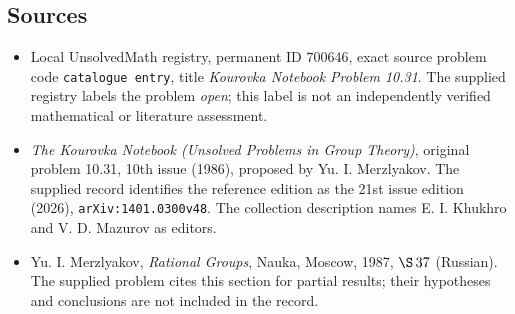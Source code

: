 \documentclass[11pt]{article}
\begin{document}
\subsection{Sources}
\begin{itemize}
\item Local UnsolvedMath registry, permanent ID \(700646\), exact source problem code \texttt{catalogue entry}, title \emph{Kourovka Notebook Problem 10.31}. The supplied registry labels the problem \emph{open}; this label is not an independently verified mathematical or literature assessment.
\item \emph{The Kourovka Notebook (Unsolved Problems in Group Theory)}, original problem 10.31, 10th issue (1986), proposed by Yu. I. Merzlyakov. The supplied record identifies the reference edition as the 21st issue edition (2026), \texttt{arXiv:1401.0300v48}. The collection description names E. I. Khukhro and V. D. Mazurov as editors.
\item Yu. I. Merzlyakov, \emph{Rational Groups}, Nauka, Moscow, 1987, \(\S\,37\) (Russian). The supplied problem cites this section for partial results; their hypotheses and conclusions are not included in the record.
\end{itemize}
\end{document}
